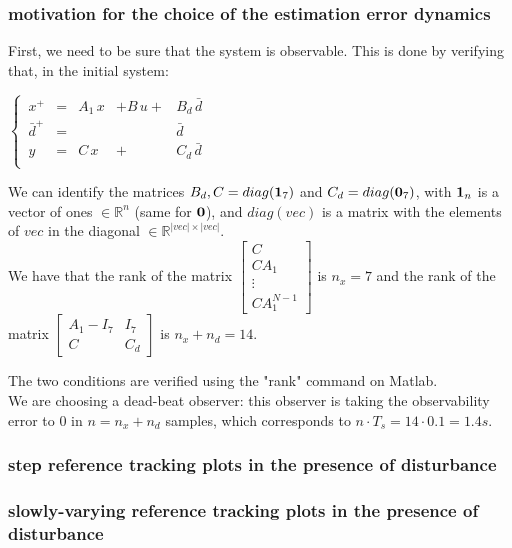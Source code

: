 \documentclass[a4paper]{report}
\begin{document}
\subsubsection*{motivation for the choice of the estimation error dynamics}
First, we need to be sure that the system is observable. This is done by verifying that, in the initial system: \par
$ \left\{
      \begin{aligned}
        \,x^+& =& A_1\,x& + B\,u +& B_d\,\bar{d}&\\
        \,\bar{d}^+& =& & & \bar{d}& \\
        \,y& =& C\,x& +& C_d\,\bar{d}& \\
      \end{aligned}
    \right.
$ \par
We can identify the matrices $B_d, C = diag(\bold{1}_7)$ and $C_d = diag(\bold{0}_7)$, with $\bold{1}_n$ is a vector of ones $\in \mathbb{R}^n$ (same for $\bold{0}$), and $diag(vec)$ is a matrix with the elements of $vec$ in the diagonal $\in \mathbb{R}^{|vec| \times |vec|}$. \\

We have that the rank of the matrix $\begin{bmatrix} C \\ CA_1 \\ \vdots  \\ CA_1^{N-1} \end{bmatrix}$ is $n_x = 7$ and the rank of the matrix $\begin{bmatrix} A_1 - I_7 & I_7 \\ C & C_d \end{bmatrix}$ is $n_x + n_d = 14$. \par
The two conditions are verified using the "rank" command on Matlab. \\

We are choosing a dead-beat observer: this observer is taking the observability error to $0$ in $n = n_x + n_d$ samples, which corresponds to $n \cdot T_s = 14 \cdot 0.1 = 1.4s$. \par


\subsubsection*{step reference tracking plots in the presence of disturbance}
\subsubsection*{slowly-varying reference tracking plots in the presence of disturbance}
\end{document}
